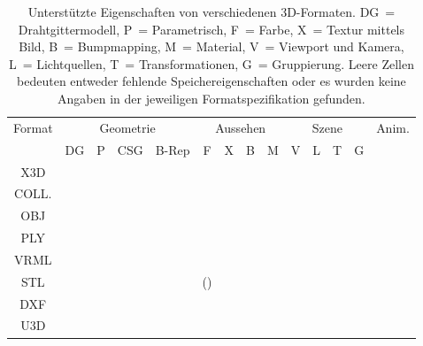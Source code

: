 \begin{table}[hbt]
\centering
\footnotesize
\begin{tabular}{cccccccccccccc}
	\toprule
	Format	& \multicolumn{4}{c}{Geometrie} & \multicolumn{4}{c}{Aussehen} & \multicolumn{4}{c}{Szene} & Anim.\\
	\cmidrule(lr){2-5}
	\cmidrule(lr){6-9}
	\cmidrule(lr){10-13}
		 & DG & P & CSG & B-Rep & F & X & B & M & V & L & T & G & \\
	\midrule
	X3D & \checkmark & \checkmark & & & \checkmark & \checkmark & \checkmark& \checkmark & \checkmark & \checkmark & \checkmark & \checkmark & \checkmark \\
	\cmidrule(lr){2-5}
	\cmidrule(lr){6-9}
	\cmidrule(lr){10-13}
	COLL. & \checkmark & \checkmark & &\checkmark &\checkmark &\checkmark & \checkmark& \checkmark & \checkmark & \checkmark & \checkmark & \checkmark & \checkmark \\
	\cmidrule(lr){2-5}
	\cmidrule(lr){6-9}
	\cmidrule(lr){10-13}
	OBJ &\checkmark &\checkmark & & &\checkmark &\checkmark &\checkmark &\checkmark & & & &\checkmark &  \\
	\cmidrule(lr){2-5}
	\cmidrule(lr){6-9}
	\cmidrule(lr){10-13}
	PLY &\checkmark & & & &\checkmark &\checkmark &\checkmark &\checkmark & & & & &  \\
	\cmidrule(lr){2-5}
	\cmidrule(lr){6-9}
	\cmidrule(lr){10-13}
	VRML & \checkmark & \checkmark & & & \checkmark & \checkmark & \checkmark& \checkmark & \checkmark & \checkmark & \checkmark & \checkmark & \checkmark \\
	\cmidrule(lr){2-5}
	\cmidrule(lr){6-9}
	\cmidrule(lr){10-13}
	STL &\checkmark & & & &(\checkmark) & & & & & & & &  \\
	\cmidrule(lr){2-5}
	\cmidrule(lr){6-9}
	\cmidrule(lr){10-13}
	DXF &\checkmark &\checkmark &\checkmark &\checkmark &\checkmark & & & & & & &\checkmark &  \\
	\cmidrule(lr){2-5}
	\cmidrule(lr){6-9}
	\cmidrule(lr){10-13}
	U3D & \checkmark & & & & \checkmark & \checkmark & \checkmark& & \checkmark & \checkmark & \checkmark & \checkmark & \checkmark \\
	\cmidrule(lr){2-5}
	\cmidrule(lr){6-9}
	\cmidrule(lr){10-13}
	\bottomrule 
\end{tabular}
\caption{Unterstützte Eigenschaften von verschiedenen 3D-Formaten. DG~= Drahtgittermodell, P~= Parametrisch, F~= Farbe, X~= Textur mittels Bild, B~= Bumpmapping, M~= Material, V~= Viewport und Kamera, L~= Lichtquellen, T~= Transformationen, G~= Gruppierung. Leere Zellen bedeuten entweder fehlende Speichereigenschaften oder es wurden keine Angaben in der jeweiligen Formatspezifikation gefunden.}
\label{tab:3Deigenschaften}
\end{table}

